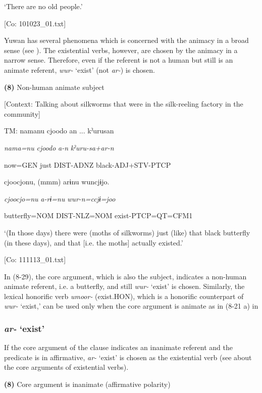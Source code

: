       ‘There are no old people.’

      [Co: 101023\_01.txt]

Yuwan has several phenomena which is concerned with the animacy in a broad sense (see ). The existential verbs, however, are chosen by the animacy in a narrow sense. Therefore, even if the referent is not a human but still is an animate referent, \textit{wur-} ‘exist’ (not \textit{ar-}) is chosen.

\textbf{(8)}  Non-human animate subject

  [Context: Talking about silkworms that were in the silk-reeling factory in the community]

  TM:  namanu  cjoodo  an ...  kˀurusan

    \textit{nama=nu}  \textit{cjoodo}  \textit{a-n}  \textit{kˀuru-sa+ar-n}

    now=GEN  just  DIST-ADNZ  black-ADJ+STV-PTCP

    cjoocjonu,  (mmm)  arɨnu  wuncjɨjo.

    \textit{cjoocjo=nu}    \textit{a-rɨ=nu}  \textit{wur{}-n=ccjɨ=joo}

    butterfly=NOM    DIST-NLZ=NOM  exist-PTCP=QT=CFM1

    ‘(In those days) there were (moths of silkworms) just (like) that black butterfly (in these days), and that [i.e. the moths] actually existed.’

    [Co: 111113\_01.txt]

In (8-29), the core argument, which is also the subject, indicates a non-human animate referent, i.e. a butterfly, and still \textit{wur-} ‘exist’ is chosen. Similarly, the lexical honorific verb \textit{umoor-} (exist.HON), which is a honorific counterpart of \textit{wur-} ‘exist,’ can be used only when the core argument is animate as in (8-21 a) in 

\subsubsection{\textit{ar-} ‘exist’}

If the core argument of the clause indicates an inanimate referent and the predicate is in affirmative, \textit{ar-} ‘exist’ is chosen as the existential verb (see  about the core arguments of existential verbs).

\textbf{(8)}  Core argument is inanimate (affirmative polarity)

